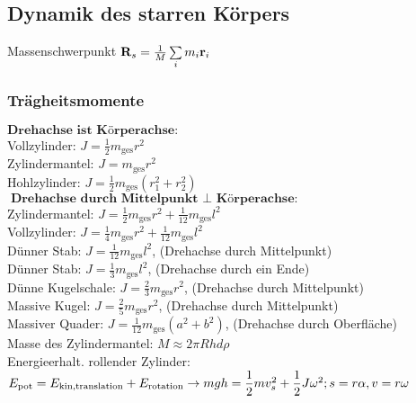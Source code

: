 \documentclass[fs, footer]{latex4ei}
\begin{document}
\begin{multicols*}{4}
\subsection{Dynamik des starren Körpers}
Massenschwerpunkt $\v R_s = \frac{1}{M}\sum_im_i\v r_i$\\ %
\subsubsection{Trägheitsmomente}
$\textbf{Drehachse ist Körperachse:}$\\
Vollzylinder: $J = \frac{1}{2}m_{\text{ges}}r^2$\\
Zylindermantel: $J = m_{\text{ges}}r^2$\\
Hohlzylinder: $J = \frac{1}{2}m_{\text{ges}}(r_1^2+r_2^2)$\\

$\textbf{Drehachse durch Mittelpunkt $\perp$ Körperachse:}$\\
Zylindermantel: $J = \frac{1}{2}m_{\text{ges}}r^2 + \frac{1}{12}m_{\text{ges}}l^2$\\
Vollzylinder: $J = \frac{1}{4}m_{\text{ges}}r^2 + \frac{1}{12}m_{\text{ges}}l^2$\\
Dünner Stab: $J = \frac{1}{12}m_{\text{ges}}l^2$, (Drehachse durch Mittelpunkt)\\
Dünner Stab:  $J = \frac{1}{3}m_{\text{ges}}l^2$, (Drehachse durch ein Ende)\\
Dünne Kugelschale: $J = \frac{2}{3}m_{\text{ges}}r^2$, (Drehachse durch Mittelpunkt)\\
Massive Kugel: $J = \frac{2}{5}m_{\text{ges}}r^2$, (Drehachse durch Mittelpunkt)\\
Massiver Quader: $J = \frac{1}{12}m_{\text{ges}}(a^2+b^2)$, (Drehachse durch Oberfläche)\\


Masse des Zylindermantel: $M \approx 2 \pi R h d \rho$\\
Energieerhalt. rollender Zylinder: $E_{\text{pot}} = E_{\text{kin,translation}} + E_{\text{rotation}} \rightarrow mgh = \dfrac{1}{2}mv_s^2 + \dfrac{1}{2}J\omega ^2; s = r\alpha, v = r\omega$\\



\end{multicols*}
\end{document}
